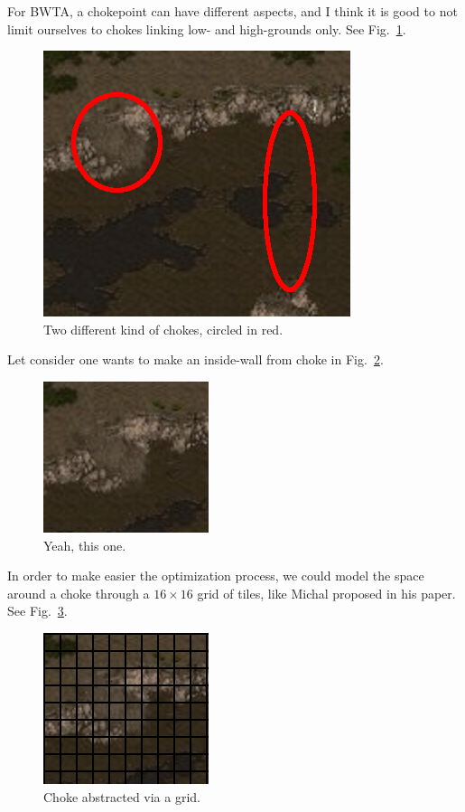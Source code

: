 \documentclass[a4paper,11pt]{article}
\begin{document}
For BWTA, a  chokepoint can have different aspects, and  I think it is
good to  not limit ourselves  to chokes linking low-  and high-grounds
only. See Fig.~\ref{figs:chokes}.

\begin{figure}[!h]
  \centering
  \includegraphics[width=.6\linewidth]{figs/chokes_circled}
  \caption{Two different kind of chokes, circled in red.}
  \label{figs:chokes}
\end{figure}

Let  consider  one  wants  to   make  an  inside-wall  from  choke  in
Fig.~\ref{figs:choke_alone}.

\begin{figure}[!h]
  \centering
  \includegraphics[width=.4\linewidth]{figs/choke_alone}
  \caption{Yeah, this one.}
  \label{figs:choke_alone}
\end{figure}

In order to  make easier the optimization process,  we could model the
space around  a choke  through a  $16 \times 16$  grid of  tiles, like
Michal proposed in his paper. See Fig.~\ref{figs:choke_grid}.

\begin{figure}[!h]
  \centering
  \includegraphics[width=.4\linewidth]{figs/choke_grid}
  \caption{Choke abstracted via a grid.}
  \label{figs:choke_grid}
\end{figure}
\end{document}
